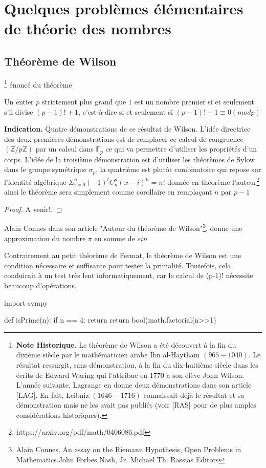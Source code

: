 \section{Quelques probl\`emes élémentaires de théorie des nombres}

\subsection{Théorème de Wilson}\footnote{\textbf{Note Historique.} Le théorème de Wilson a été découvert à la fin du dixième siècle par le mathématicien arabe Ibn al-Haytham $(965-1040)$. Le résultat ressurgit, sans démonstration, à la fin du dix-huitième siècle dans les écrits de Edward Waring qui l’attribue en 1770 à son élève John Wilson. L’année suivante, Lagrange en donne deux démonstrations dans son article [LAG]. En fait, Leibniz $(1646-1716)$ connaissait déjà le résultat et sa démonstration mais ne les avait pas publiés (voir [RAS] pour de plus amples considérations historiques).}
\'enoncé du théorème 
\begin{theorem}
 Un entier $p$ strictement plus grand que $1$ est un nombre premier si et seulement s'il divise $(p - 1)! + 1$, c'est-à-dire si et seulement si $(p-1)!+ 1 \equiv 0 (mod p)$
\end{theorem}
\textbf{Indication.}  Quatre démonstrations de ce résultat de Wilson. L'idée directrice des deux premières démonstrations est de remplacer ce calcul de congruence $(\mathbb{Z}/p\mathbb{Z})$ par un calcul dans $\mathbb{F}_{p}$ ce qui va permettre d'utiliser les propriétés d’un corps. L'idée de la troisième démonstration est d’utiliser les théorèmes de Sylow dans le groupe symétrique $\mathbb{\sigma}_{p}$, la quatrième est plutôt combinatoire qui repose sur l'identité algébrique $\Sigma_{i=0}^{n} (-1)^{i} C_n^{p}(x-i)^n = n!$ donnée en théorème l'auteur\footnote{https://arxiv.org/pdf/math/0406086.pdf} ainsi le théorème sera simplement comme
corollaire en remplaçant $n$ par $p-1$
\begin{proof}
A venir!.
\end{proof}
Alain Connes dans son article "Autour du théorème de Wilson"\footnote{Alain Connes, An essay on the Riemann Hypothesis, Open Problems in Mathematics.John Forbes Nash, Jr. Michael Th. Rassias Editors}, donne une approximation du nombre $\pi$ en somme de $sin$
\begin{remark}
Contrairement au petit théorème de Fermat, le théorème de Wilson est une condition nécessaire et suffisante pour tester la primalité. Toutefois, cela conduirait à un test très lent informatiquement, car le calcul de (p-1)! nécessite beaucoup d'opérations.
\end{remark}
\begin{python}
import sympy

def isPrime(n):
 if n == 4: return 
 return bool(math.factorial(n>>1)%
\end{python}
